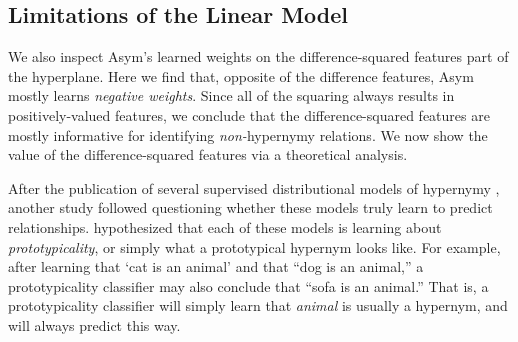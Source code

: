 \subsection{Limitations of the Linear Model}
\label{sec:linearlimits}

We also inspect Asym's learned weights on the difference-squared features part
of the hyperplane. Here we find that, opposite of the difference features, Asym
mostly learns {\em negative weights}. Since all of the squaring always results
in positively-valued features, we conclude that the difference-squared features
are mostly informative for identifying {\em non-}hypernymy relations. We now
show the value of the difference-squared features via a theoretical analysis.

After the publication of several supervised distributional models of hypernymy
\cite{baroni:2011:gems,fu:2014:acl,roller:2014:coling,weeds:2014:coling},
another study followed questioning whether these models truly learn to predict
relationships.  hypothesized that each of these models
is learning about {\em prototypicality}, or simply what a prototypical
hypernym looks like. For example, after learning that `cat is an animal'
and that ``dog is an animal,'' a prototypicality classifier may also conclude
that ``sofa is an animal.'' That is, a prototypicality classifier will
simply learn that {\em animal} is usually a hypernym, and will always
predict this way.

